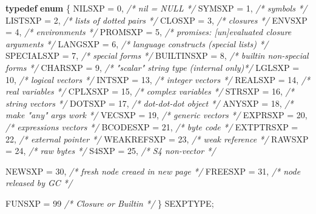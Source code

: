 \documentclass[]{book}
\newenvironment{Shaded}{\begin{snugshade}}{\end{snugshade}}
\newcommand{\KeywordTok}[1]{\textcolor[rgb]{0.13,0.29,0.53}{\textbf{{#1}}}}
\newcommand{\DecValTok}[1]{\textcolor[rgb]{0.00,0.00,0.81}{{#1}}}
\newcommand{\CommentTok}[1]{\textcolor[rgb]{0.56,0.35,0.01}{\textit{{#1}}}}
\newcommand{\NormalTok}[1]{{#1}}
\begin{document}
\begin{Shaded}
\begin{Highlighting}[]
\KeywordTok{typedef} \KeywordTok{enum} \NormalTok{\{}
    \NormalTok{NILSXP  = }\DecValTok{0}\NormalTok{,    }\CommentTok{/* nil = NULL */}
    \NormalTok{SYMSXP  = }\DecValTok{1}\NormalTok{,    }\CommentTok{/* symbols */}
    \NormalTok{LISTSXP = }\DecValTok{2}\NormalTok{,    }\CommentTok{/* lists of dotted pairs */}
    \NormalTok{CLOSXP  = }\DecValTok{3}\NormalTok{,    }\CommentTok{/* closures */}
    \NormalTok{ENVSXP  = }\DecValTok{4}\NormalTok{,    }\CommentTok{/* environments */}
    \NormalTok{PROMSXP = }\DecValTok{5}\NormalTok{,    }\CommentTok{/* promises: [un]evaluated closure arguments */}
    \NormalTok{LANGSXP = }\DecValTok{6}\NormalTok{,    }\CommentTok{/* language constructs (special lists) */}
    \NormalTok{SPECIALSXP  = }\DecValTok{7}\NormalTok{,    }\CommentTok{/* special forms */}
    \NormalTok{BUILTINSXP  = }\DecValTok{8}\NormalTok{,    }\CommentTok{/* builtin non-special forms */}
    \NormalTok{CHARSXP = }\DecValTok{9}\NormalTok{,    }\CommentTok{/* "scalar" string type (internal only)*/}
    \NormalTok{LGLSXP  = }\DecValTok{10}\NormalTok{,   }\CommentTok{/* logical vectors */}
    \NormalTok{INTSXP  = }\DecValTok{13}\NormalTok{,   }\CommentTok{/* integer vectors */}
    \NormalTok{REALSXP = }\DecValTok{14}\NormalTok{,   }\CommentTok{/* real variables */}
    \NormalTok{CPLXSXP = }\DecValTok{15}\NormalTok{,   }\CommentTok{/* complex variables */}
    \NormalTok{STRSXP  = }\DecValTok{16}\NormalTok{,   }\CommentTok{/* string vectors */}
    \NormalTok{DOTSXP  = }\DecValTok{17}\NormalTok{,   }\CommentTok{/* dot-dot-dot object */}
    \NormalTok{ANYSXP  = }\DecValTok{18}\NormalTok{,   }\CommentTok{/* make "any" args work */}
    \NormalTok{VECSXP  = }\DecValTok{19}\NormalTok{,   }\CommentTok{/* generic vectors */}
    \NormalTok{EXPRSXP = }\DecValTok{20}\NormalTok{,   }\CommentTok{/* expressions vectors */}
    \NormalTok{BCODESXP    = }\DecValTok{21}\NormalTok{,   }\CommentTok{/* byte code */}
    \NormalTok{EXTPTRSXP   = }\DecValTok{22}\NormalTok{,   }\CommentTok{/* external pointer */}
    \NormalTok{WEAKREFSXP  = }\DecValTok{23}\NormalTok{,   }\CommentTok{/* weak reference */}
    \NormalTok{RAWSXP  = }\DecValTok{24}\NormalTok{,   }\CommentTok{/* raw bytes */}
    \NormalTok{S4SXP   = }\DecValTok{25}\NormalTok{,   }\CommentTok{/* S4 non-vector */}

    \NormalTok{NEWSXP      = }\DecValTok{30}\NormalTok{,   }\CommentTok{/* fresh node creaed in new page */}
    \NormalTok{FREESXP     = }\DecValTok{31}\NormalTok{,   }\CommentTok{/* node released by GC */}

    \NormalTok{FUNSXP  = }\DecValTok{99}    \CommentTok{/* Closure or Builtin */}
\NormalTok{\} SEXPTYPE;}
\end{Highlighting}
\end{Shaded}
\end{document}
